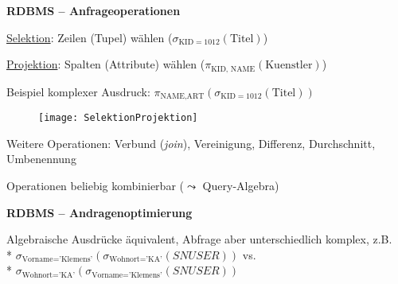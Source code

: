 \textbf{RDBMS -- Anfrageoperationen}
\begin{items}
  \item \underline{Selektion}: Zeilen (Tupel) wählen (\( \sigma_{\text{KID}=1012}(\text{Titel}) \))
  \item \underline{Projektion}: Spalten (Attribute) wählen (\( \pi_{\text{KID, NAME}}(\text{Kuenstler}) \))
  \item Beispiel komplexer Ausdruck: \( \pi_{\text{NAME}, \text{ART}}(\sigma_{\text{KID}=1012}(\text{Titel})) \)
  \begin{figure}[H]\centering\label{SelektionProjektion}\texttt{[image: SelektionProjektion]}\end{figure}
  \item Weitere Operationen: Verbund (\emph{join}), Vereinigung, Differenz, Durchschnitt, Umbenennung
  \item Operationen beliebig kombinierbar (\( \leadsto \) Query-Algebra)
\end{items}

\textbf{RDBMS -- Andragenoptimierung}
\begin{items}
  \item Algebraische Ausdrücke äquivalent, Abfrage aber unterschiedlich komplex, z.B. \\* \( \sigma_{\text{Vorname} = \text{'Klemens'}}(\sigma_{\text{Wohnort} = \text{'KA'}}(SNUSER)) \) vs. \\* \( \sigma_{\text{Wohnort} = \text{'KA'}}(\sigma_{\text{Vorname} = \text{'Klemens'}}(SNUSER)) \)
\end{items}